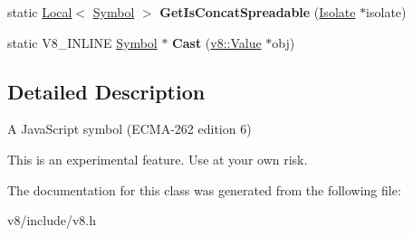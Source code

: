 \begin{DoxyCompactItemize}
\item 
static \hyperlink{classv8_1_1Local}{Local}$<$ \hyperlink{classv8_1_1Symbol}{Symbol} $>$ {\bfseries Get\+Is\+Concat\+Spreadable} (\hyperlink{classv8_1_1Isolate}{Isolate} $\ast$isolate)\hypertarget{classv8_1_1Symbol_acf0d506838dbf518537c17a72571c0bf}{}\label{classv8_1_1Symbol_acf0d506838dbf518537c17a72571c0bf}

\item 
static V8\+\_\+\+I\+N\+L\+I\+NE \hyperlink{classv8_1_1Symbol}{Symbol} $\ast$ {\bfseries Cast} (\hyperlink{classv8_1_1Value}{v8\+::\+Value} $\ast$obj)\hypertarget{classv8_1_1Symbol_a6bb214df5e2d8655379a648530aebaf1}{}\label{classv8_1_1Symbol_a6bb214df5e2d8655379a648530aebaf1}

\end{DoxyCompactItemize}


\subsection{Detailed Description}
A Java\+Script symbol (E\+C\+M\+A-\/262 edition 6)

This is an experimental feature. Use at your own risk. 

The documentation for this class was generated from the following file\+:\begin{DoxyCompactItemize}
\item 
v8/include/v8.\+h\end{DoxyCompactItemize}
